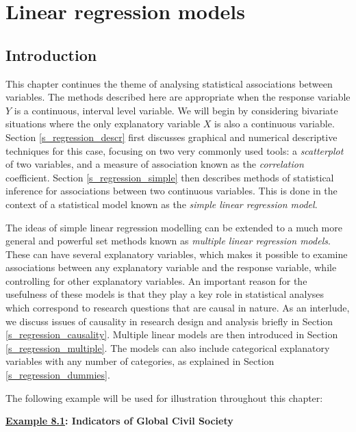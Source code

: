 \chapter{Linear regression models}
\label{c_regression}

\section{Introduction}
\label{s_regression_intro}

This chapter continues the theme of analysing statistical associations
between variables. The methods described here are appropriate when the
response variable $Y$ is a continuous, interval level variable. We
will begin by considering bivariate situations where the only explanatory variable
$X$ is also a continuous variable. Section \ref{s_regression_descr}
first discusses graphical and numerical descriptive techniques for this
case, focusing on two very commonly used tools: a \emph{scatterplot} of
two variables, and a measure of association known as the
\emph{correlation} coefficient. Section \ref{s_regression_simple} then
describes methods of statistical inference for associations between two
continuous variables. This is done in the context of a statistical model
known as the \emph{simple linear regression model}.

The ideas of simple linear regression modelling can be extended to a
much more general and powerful set methods known as \emph{multiple
linear regression models}.
These can have several explanatory
variables, which makes it possible to examine associations between any
explanatory variable and the response variable, while controlling for
other explanatory variables.
An important reason for the usefulness of
these models is that they play a key role in statistical analyses
which correspond to research questions that are causal in nature.
As an interlude, we discuss issues of causality in research design and
analysis briefly in Section \ref{s_regression_causality}.
Multiple linear models are then
introduced in Section
\ref{s_regression_multiple}.
The models can also include categorical
explanatory variables with any number of categories, as explained in
Section \ref{s_regression_dummies}.

The following example will be used for illustration throughout this
chapter:

\textbf{\underline{Example 8.1}: Indicators of Global Civil Society}
\label{p_civilsoc}

